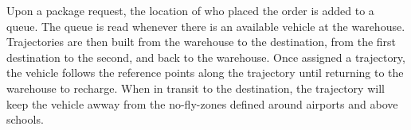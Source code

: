 Upon a package request, the location of who placed the order is added to a queue. The queue is read whenever there is an available vehicle at the warehouse. Trajectories are then built from the warehouse to the destination, from the first destination to the second, and back to the warehouse. Once assigned a trajectory, the vehicle follows the reference points along the trajectory until returning to the warehouse to recharge. When in transit to the destination, the trajectory will keep the vehicle awway from the no-fly-zones defined around airports and above schools.